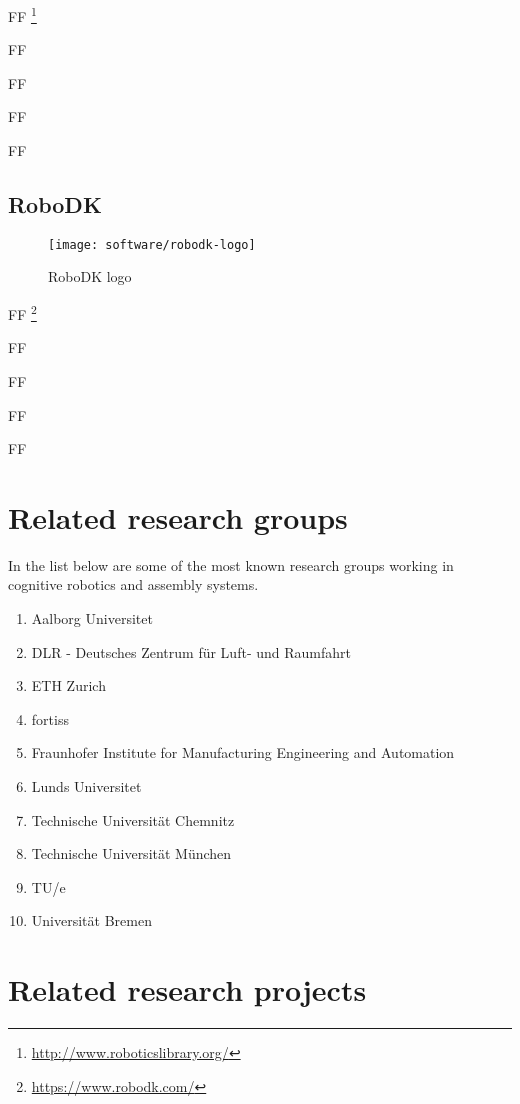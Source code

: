FF \footnote{\url{http://www.roboticslibrary.org/}}

FF

FF

FF

FF


\subsection{RoboDK}

\begin{wrapfigure}{r}{0.23\textwidth}
	\centering
	\vspace*{-2em}
	\texttt{[image: software/robodk-logo]}
	\caption{RoboDK logo}
	\label{fig:robodk-logo}
\end{wrapfigure}

FF \footnote{\url{https://www.robodk.com/}}

FF

FF

FF

FF


\section{Related research groups}

In the list below are some of the most known research groups working in cognitive robotics and assembly systems.

\begin{enumerate}
	\item Aalborg Universitet
	\item DLR - Deutsches Zentrum für Luft- und Raumfahrt
	\item ETH Zurich
	\item fortiss
	\item Fraunhofer Institute for Manufacturing Engineering and Automation
	\item Lunds Universitet
	\item Technische Universität Chemnitz
	\item Technische Universität München
	\item TU/e
	\item Universität Bremen
\end{enumerate}


\section{Related research projects}

